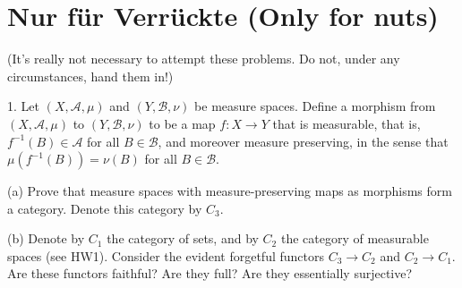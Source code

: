 \documentclass{qlnotes-export}
\begin{document}
\section{Nur für Verrückte (Only for nuts)}\label{nur-fuxfcr-verruxfcckte-only-for-nuts}

(It's really not necessary to attempt these problems. Do not, under any circumstances, hand them in!)

1. Let \((X,\mathcal{A},\mu)\) and \((Y,\mathcal{B},\nu)\) be measure spaces. Define a morphism from \((X,\mathcal{A},\mu)\) to \((Y,\mathcal{B},\nu)\) to be a map \(f:X\rightarrow Y\) that is measurable, that is, \(f^{- 1}(B) \in \mathcal{A}\) for all \(B \in \mathcal{B}\), and moreover measure preserving, in the sense that \(\mu(f^{- 1}(B)) = \nu(B)\) for all \(B \in \mathcal{B}\).

(a) Prove that measure spaces with measure-preserving maps as morphisms form a category. Denote this category by \(C_{3}\).

(b) Denote by \(C_{1}\) the category of sets, and by \(C_{2}\) the category of measurable spaces (see HW1). Consider the evident forgetful functors \(C_{3}\rightarrow C_{2}\) and \(C_{2}\rightarrow C_{1}\). Are these functors faithful? Are they full? Are they essentially surjective?
\end{document}
